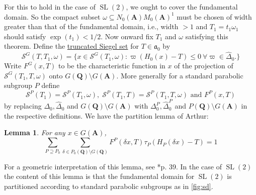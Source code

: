 \documentclass[11pt]{amsart}
\def\A{\mathbf A}
\def\Q{\mathbf Q}
\def\SSS{\mathcal S}
\def\aaa{\mathfrak a}
\def\bs{\setminus}
\def\sl{\operatorname{SL}}
\newtheorem{lemma}[theorem]{Lemma}
\theoremstyle{remark}
\begin{document}
For this to hold in the case of $\sl(2)$, we ought to cover the fundamental domain. So the compact subset $\omega \subseteq N_0(\A) M_0(\A)^1$ must be chosen of width greater than that of the fundamental domain, i.e., width $> 1$ and $T_1 = t_1 \omega_1$ should satisfy $\exp(t_1) < 1/2$. Now onward fix $T_1$ and $\omega$ satisfying this theorem. Define the \underline{truncated Siegel set} for $T \in \aaa_0$ by
\[ \SSS^G(T, T_1, \omega) = \{ x \in \SSS^G(T_1, \omega) : \varpi(H_0(x) - T) \leq 0 \ \forall \varpi \in \hat\Delta_0. \} \]
Write $F^G(x, T)$ to be the characteristic function in $x$ of the projection of $\SSS^G(T_1, T, \omega)$ onto $G(\Q)\bs G(\A)$. More generally for a standard parabolic subgroup $P$ define 
\[ \SSS^P(T_1) = \SSS^P(T_1, \omega), \; \SSS^P(T_1, T) = \SSS^P(T_1, T, \omega) \text{ and } F^P(x, T) \]
by replacing $\Delta_0, \hat\Delta_0$ and $G(\Q)\bs G(\A)$ with $\Delta_0^P, \hat \Delta_0^P$ and $P(\Q)\bs G(\A)$ in the respective definitions. We have the partition lemma of Arthur:
\begin{lemma} \label{partition_lemma}
	For any $x \in G(\A)$, 
	\[ \sum_{P \supseteq P_0} \sum_{\delta \in P_0(\Q) \bs G(\Q)} F^P(\delta x, T) \tau_P(H_P(\delta x) - T) = 1 \]
\end{lemma}
For a geometric interpretation of this lemma, see \cite{clay}*{p. 39}. In the case of $\sl(2)$ the content of this lemma is that the fundamental domain for $\sl(2)$ is partitioned according to standard parabolic subgroups as in \cref{fig:sd}.
\end{document}
